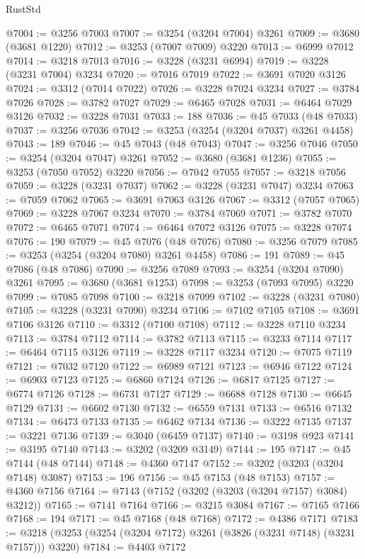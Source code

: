 \begin{lexlean}{RustStd}
\begin{coremodule}
@7004 := @3256 @7003
@7007 := @3254 (@3204 @7004) @3261
@7009 := @3680 (@3681 @1220)
@7012 := @3253 (@7007 @7009) @3220
@7013 := @6999 @7012
@7014 := @3218 @7013
@7016 := @3228 (@3231 @6994)
@7019 := @3228 (@3231 @7004) @3234
@7020 := @7016 @7019
@7022 := @3691 @7020 @3126
@7024 := @3312 (@7014 @7022)
@7026 := @3228 @7024 @3234
@7027 := @3784 @7026
@7028 := @3782 @7027
@7029 := @6465 @7028
@7031 := @6464 @7029 @3126
@7032 := @3228 @7031
@7033 := 188
@7036 := @45 @7033 (@48 @7033)
@7037 := @3256 @7036
@7042 := @3253 (@3254 (@3204 @7037) @3261 @4458)
@7043 := 189
@7046 := @45 @7043 (@48 @7043)
@7047 := @3256 @7046
@7050 := @3254 (@3204 @7047) @3261
@7052 := @3680 (@3681 @1236)
@7055 := @3253 (@7050 @7052) @3220
@7056 := @7042 @7055
@7057 := @3218 @7056
@7059 := @3228 (@3231 @7037)
@7062 := @3228 (@3231 @7047) @3234
@7063 := @7059 @7062
@7065 := @3691 @7063 @3126
@7067 := @3312 (@7057 @7065)
@7069 := @3228 @7067 @3234
@7070 := @3784 @7069
@7071 := @3782 @7070
@7072 := @6465 @7071
@7074 := @6464 @7072 @3126
@7075 := @3228 @7074
@7076 := 190
@7079 := @45 @7076 (@48 @7076)
@7080 := @3256 @7079
@7085 := @3253 (@3254 (@3204 @7080) @3261 @4458)
@7086 := 191
@7089 := @45 @7086 (@48 @7086)
@7090 := @3256 @7089
@7093 := @3254 (@3204 @7090) @3261
@7095 := @3680 (@3681 @1253)
@7098 := @3253 (@7093 @7095) @3220
@7099 := @7085 @7098
@7100 := @3218 @7099
@7102 := @3228 (@3231 @7080)
@7105 := @3228 (@3231 @7090) @3234
@7106 := @7102 @7105
@7108 := @3691 @7106 @3126
@7110 := @3312 (@7100 @7108)
@7112 := @3228 @7110 @3234
@7113 := @3784 @7112
@7114 := @3782 @7113
@7115 := @3233 @7114
@7117 := @6464 @7115 @3126
@7119 := @3228 @7117 @3234
@7120 := @7075 @7119
@7121 := @7032 @7120
@7122 := @6989 @7121
@7123 := @6946 @7122
@7124 := @6903 @7123
@7125 := @6860 @7124
@7126 := @6817 @7125
@7127 := @6774 @7126
@7128 := @6731 @7127
@7129 := @6688 @7128
@7130 := @6645 @7129
@7131 := @6602 @7130
@7132 := @6559 @7131
@7133 := @6516 @7132
@7134 := @6473 @7133
@7135 := @6462 @7134
@7136 := @3222 @7135
@7137 := @3221 @7136
@7139 := @3040 (@6459 @7137)
@7140 := @3198 @923
@7141 := @3195 @7140
@7143 := @3202 (@3209 @3149)
@7144 := 195
@7147 := @45 @7144 (@48 @7144)
@7148 := @4360 @7147
@7152 := @3202 (@3203 (@3204 @7148) @3087)
@7153 := 196
@7156 := @45 @7153 (@48 @7153)
@7157 := @4360 @7156
@7164 := @7143 (@7152 (@3202 (@3203 (@3204 @7157) @3084) @3212))
@7165 := @7141 @7164
@7166 := @3215 @3084
@7167 := @7165 @7166
@7168 := 194
@7171 := @45 @7168 (@48 @7168)
@7172 := @4386 @7171
@7183 := @3218 (@3253 (@3254 (@3204 @7172) @3261 (@3826 (@3231 @7148) (@3231 @7157))) @3220)
@7184 := @4403 @7172

\end{coremodule}
\end{lexlean}

